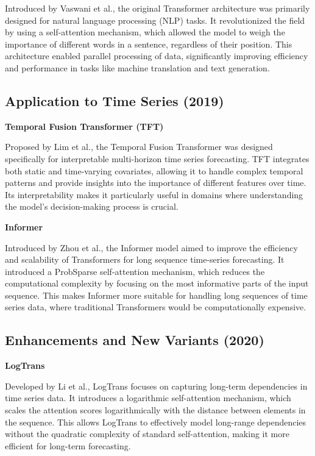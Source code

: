 Introduced by Vaswani et al.\cite{vaswani2023attention}, the original Transformer architecture was primarily designed for natural language processing (NLP) tasks. It revolutionized the field by using a self-attention mechanism, which allowed the model to weigh the importance of different words in a sentence, regardless of their position. This architecture enabled parallel processing of data, significantly improving efficiency and performance in tasks like machine translation and text generation.
\vspace{10pt}


\subsection{Application to Time Series (2019)}
\noindent\textbf
{Temporal Fusion Transformer (TFT)}

\noindent Proposed by Lim et al.\cite{lim2020temporalfusiontransformersinterpretable}, the Temporal Fusion Transformer was designed specifically for interpretable multi-horizon time series forecasting. TFT integrates both static and time-varying covariates, allowing it to handle complex temporal patterns and provide insights into the importance of different features over time. Its interpretability makes it particularly useful in domains where understanding the model’s decision-making process is crucial.
\vspace{10pt}


\noindent\textbf
{Informer}

\noindent Introduced by Zhou et al.\cite{zhou2021informerefficienttransformerlong}, the Informer model aimed to improve the efficiency and scalability of Transformers for long sequence time-series forecasting. It introduced a ProbSparse self-attention mechanism, which reduces the computational complexity by focusing on the most informative parts of the input sequence. This makes Informer more suitable for handling long sequences of time series data, where traditional Transformers would be computationally expensive.
\vspace{10pt}


\subsection{Enhancements and New Variants (2020)}
\noindent\textbf
{LogTrans}

\noindent Developed by Li et al.\cite{li2020enhancinglocalitybreakingmemory}, LogTrans focuses on capturing long-term dependencies in time series data. It introduces a logarithmic self-attention mechanism, which scales the attention scores logarithmically with the distance between elements in the sequence. This allows LogTrans to effectively model long-range dependencies without the quadratic complexity of standard self-attention, making it more efficient for long-term forecasting.
\vspace{10pt}


